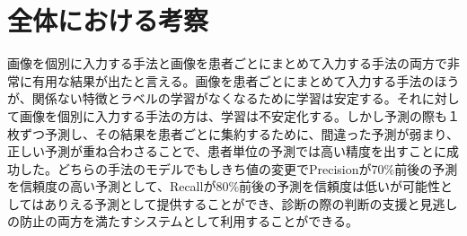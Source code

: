 \section{全体における考察}
画像を個別に入力する手法と画像を患者ごとにまとめて入力する手法の両方で非常に有用な結果が出たと言える。画像を患者ごとにまとめて入力する手法のほうが、関係ない特徴とラベルの学習がなくなるために学習は安定する。それに対して画像を個別に入力する手法の方は、学習は不安定化する。しかし予測の際も１枚ずつ予測し、その結果を患者ごとに集約するために、間違った予測が弱まり、正しい予測が重ね合わさることで、患者単位の予測では高い精度を出すことに成功した。どちらの手法のモデルでもしきち値の変更でPrecisionが70\%前後の予測を信頼度の高い予測として、Recallが80\%前後の予測を信頼度は低いが可能性としてはありえる予測として提供することができ、診断の際の判断の支援と見逃しの防止の両方を満たすシステムとして利用することができる。

